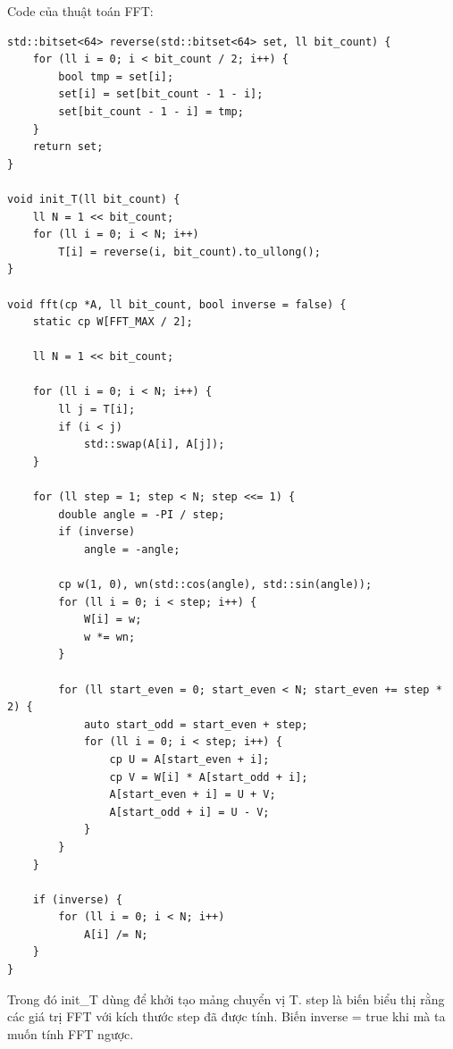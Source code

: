 \documentclass[../report.tex]{subfiles}
\begin{document}
Code của thuật toán FFT: 
\begin{lstlisting}
std::bitset<64> reverse(std::bitset<64> set, ll bit_count) {
    for (ll i = 0; i < bit_count / 2; i++) {
        bool tmp = set[i];
        set[i] = set[bit_count - 1 - i];
        set[bit_count - 1 - i] = tmp;
    }
    return set;
}

void init_T(ll bit_count) {
    ll N = 1 << bit_count;
    for (ll i = 0; i < N; i++)
        T[i] = reverse(i, bit_count).to_ullong();
}

void fft(cp *A, ll bit_count, bool inverse = false) {
    static cp W[FFT_MAX / 2];

    ll N = 1 << bit_count;

    for (ll i = 0; i < N; i++) {
        ll j = T[i];
        if (i < j) 
            std::swap(A[i], A[j]);
    }

    for (ll step = 1; step < N; step <<= 1) {
        double angle = -PI / step;
        if (inverse)
            angle = -angle;

        cp w(1, 0), wn(std::cos(angle), std::sin(angle));
        for (ll i = 0; i < step; i++) {
            W[i] = w;
            w *= wn;
        }

        for (ll start_even = 0; start_even < N; start_even += step * 2) {
            auto start_odd = start_even + step;
            for (ll i = 0; i < step; i++) {
                cp U = A[start_even + i];
                cp V = W[i] * A[start_odd + i]; 
                A[start_even + i] = U + V;
                A[start_odd + i] = U - V;
            }
        }
    }

    if (inverse) {
        for (ll i = 0; i < N; i++)
            A[i] /= N;
    }
}
\end{lstlisting}
Trong đó init\_T dùng để khởi tạo mảng chuyển vị T. step là biến biểu 
thị rằng các giá trị FFT với kích thước step đã được tính. Biến inverse = true khi mà ta muốn tính FFT ngược. 
\end{document}
